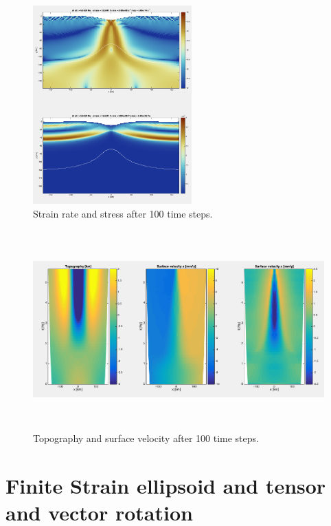 \documentclass[12pt,english,openany]{scrbook}
\begin{document}
\begin{figure}[ht!]
\centerline{\includegraphics[height=3.0in]{./Figures/RiftingPauline_MDOODZ1.png}}
\caption{Strain rate and stress after 100 time steps.}
\label{RiftingPauline_MDOODZ1}
\end{figure}

\begin{figure}[ht!]
\centerline{\includegraphics[height=3.0in]{./Figures/RiftingPauline_MDOODZ2.png}}
\caption{Topography and surface velocity after 100 time steps.}
\label{RiftingPauline_MDOODZ2}
\end{figure}

\section{Finite Strain ellipsoid and tensor and vector rotation}
\end{document}
